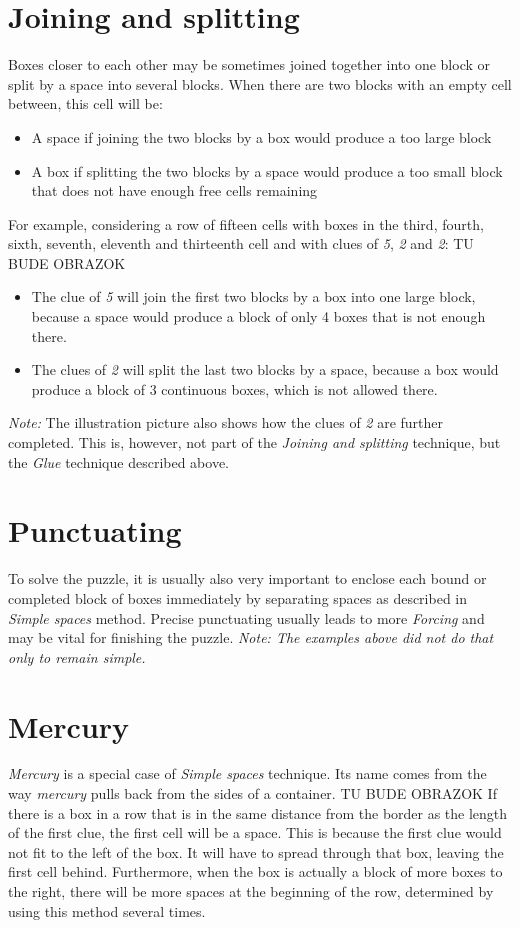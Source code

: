{{\section{Joining and splitting}
Boxes closer to each other may be sometimes joined together into one block or split by a space into several blocks. When there are two blocks with an empty cell between, this cell will be:
\begin{itemize} \item {A space if joining the two blocks by a box would produce a too large block}\item {A box if splitting the two blocks by a space would produce a too small block that does not have enough free cells remaining} \end{itemize}
For example, considering a row of fifteen cells with boxes in the third, fourth, sixth, seventh, eleventh and thirteenth cell and with clues of \textit{5}, \textit{2} and \textit{2}:
TU BUDE OBRAZOK

\begin{itemize} \item {The clue of \textit{5} will join the first two blocks by a box into one large block, because a space would produce a block of only 4 boxes that is not enough there.}\item {The clues of \textit{2} will split the last two blocks by a space, because a box would produce a block of 3 continuous boxes, which is not allowed there.} \end{itemize}
\textit{Note:} The illustration picture also shows how the clues of \textit{2} are further completed. This is, however, not part of the \textit{Joining and splitting} technique, but the \textit{Glue} technique described above.
\section{Punctuating}
To solve the puzzle, it is usually also very important to enclose each bound or completed block of boxes immediately by separating spaces as described in \textit{Simple spaces} method. Precise punctuating usually leads to more \textit{Forcing} and may be vital for finishing the puzzle. \textit{Note: The examples above did not do that only to remain simple.}
\section{Mercury}
\textit{Mercury} is a special case of \textit{Simple spaces} technique. Its name comes from the way \textit{mercury} pulls back from the sides of a container.
TU BUDE OBRAZOK
If there is a box in a row that is in the same distance from the border as the length of the first clue, the first cell will be a space. This is because the first clue would not fit to the left of the box. It will have to spread through that box, leaving the first cell behind. Furthermore, when the box is actually a block of more boxes to the right, there will be more spaces at the beginning of the row, determined by using this method several times.
}}
